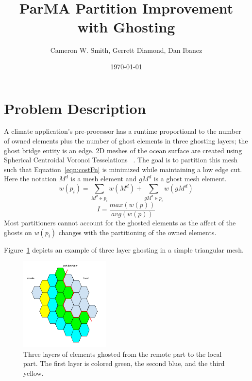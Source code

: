 \documentclass[a4paper]{article}
\title{ParMA Partition Improvement with Ghosting}
\author{Cameron W. Smith, Gerrett Diamond, Dan Ibanez}
\date{\today}
\begin{document}
\maketitle

\section{Problem Description}

A climate application's pre-processor has a runtime proportional to the number of owned elements plus the number of ghost elements in three ghosting layers; the ghost bridge entity is an edge.  2D meshes of the ocean surface are created using Spherical Centroidal Voronoi Tesselations ~\cite{JuRingler2011,ringler2008}.  The goal is to partition this mesh such that Equation~\ref{eqn:costFn} is minimized while maintaining a low edge cut.  Here the notation $M^d$ is a mesh element and $gM^d$ is a ghost mesh element.
\begin{equation}
\label{eqn:weightVoroni}
w(p_i) = \sum_{M^d \in p_i}w(M^d) + \sum_{gM^d \in p_i}w(gM^d)
\end{equation}
\begin{equation}
\label{eqn:costFn}
I = \frac{max(w(p))}{avg(w(p))}
\end{equation}
Most partitioners cannot account for the ghosted elements as the affect of the ghosts on $w(p_i)$ changes with the partitioning of the owned elements.  

Figure~\ref{fig:ghostEx} depicts an example of three layer ghosting in a simple triangular mesh.

\begin{figure} 
\centering
\includegraphics[width=0.4\textwidth]{ghostingExample.png}
\caption{\label{fig:ghostEx} Three layers of elements ghosted from the remote part to the local part.  The first layer is colored green, the second blue, and the third yellow.}
\end{figure}
\end{document}
